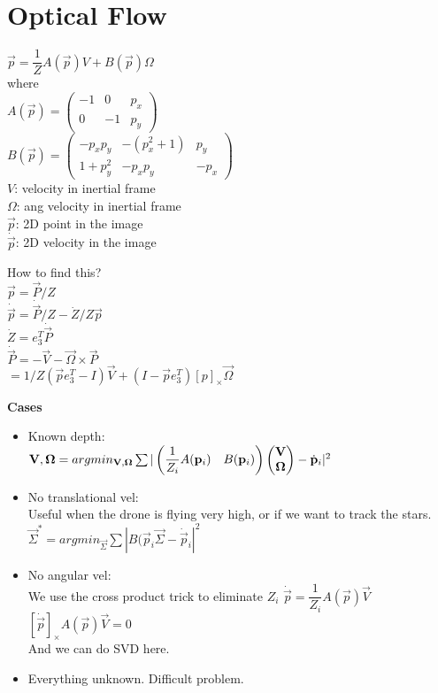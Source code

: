 \section{Optical Flow}
$\vec{p} = \dfrac{1}{Z} A(\vec{p}) V + B(\vec{p}) \Omega$\\
where \\
$A(\vec{p}) = \begin{pmatrix}
  -1 & 0 & p_x \\ 0 & -1 & p_y
\end{pmatrix}$\\
$B(\vec{p}) = \begin{pmatrix}
  -p_x p_y & -(p_x^2 +1) & p_y \\
  1 + p_y^2 & -p_x p_y & -p_x
\end{pmatrix}$\\
$V$: velocity in \alert{inertial frame}\\
$\Omega$: ang velocity in \alert{inertial frame}\\
$\vec{p}$: 2D point in the image \\
$\dot{\vec{p}}$: 2D velocity in the image

How to find this?\\
$\vec{p} = \vec{P}/Z$\\
$\dot{\vec{p}} = \dot{\vec{P}}/Z - \dot{Z}/Z \vec{p}$\\
$\dot{Z} = e_3^T \dot{\vec{P}}$\\
$\dot{\vec{P}} = - \vec{V} - \vec{\Omega} \times \vec{P}$\\
$=1/Z ( \vec{p} e_3^T - I) \vec{V} + (I - \vec{p} e_3^T)[p]_\times
\vec{\Omega}$

\textbf{Cases}
\begin{itemize}
  \item Known depth:\\
    $\vec{V}, \vec{\Omega} = argmin_{\vec{V}, \vec{\Omega}}\\
    \sum |\begin{pmatrix} \dfrac{1}{Z_i} A(\vec{p}_i) &
    B(\vec{p}_i)\end{pmatrix} 
    \begin{pmatrix}
      \vec{V}\\\vec{\Omega}
    \end{pmatrix} - \dot{\vec{p}}_i|^2$
  \item No translational vel:\\
    \alert{Useful when the drone is flying very high, or if we want to
    track the stars}.\\
    $\vec{\Sigma}^* = argmin_{\vec{\Sigma}}
    \sum |B(\vec{p}_i \vec{\Sigma} - \dot{\vec{p}}_i|^2$
  \item No angular vel:\\
    \alert{We use the cross product trick to eliminate $Z_i$}
    $\dot{\vec{p}} = \dfrac{1}{Z_i} A(\vec{p}) \vec{V}$\\
    $[\dot{\vec{p}}]_{\times} A(\vec{p}) \vec{V} = 0$\\
    And we can do SVD here.
  \item Everything unknown. Difficult problem.
\end{itemize}

